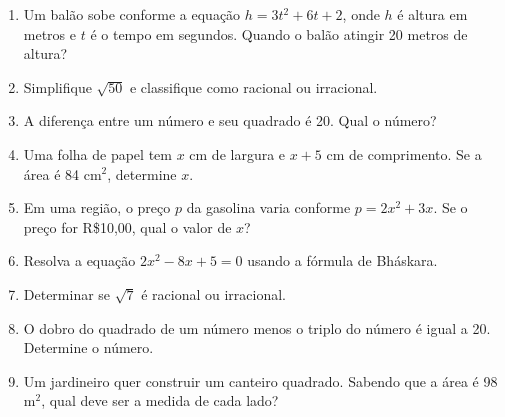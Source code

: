 \documentclass[12pt,a4paper]{article}
\begin{document}
\begin{enumerate}
\item Um bal\~ao sobe conforme a equa\c{c}\~ao \(h = 3t^2 + 6t + 2\), onde \(h\) \'e altura em metros e \(t\) \'e o tempo em segundos. Quando o bal\~ao atingir 20 metros de altura?

\item Simplifique \(\sqrt{50}\) e classifique como racional ou irracional.

\item A diferen\c{c}a entre um n\'umero e seu quadrado \'e 20. Qual o n\'umero?

\item Uma folha de papel tem \(x\) cm de largura e \(x+5\) cm de comprimento. Se a \'{a}rea \'e 84 cm$^2$, determine \(x\).

\item Em uma regi\~ao, o pre\c{c}o \(p\) da gasolina varia conforme \(p = 2x^2 + 3x\). Se o pre\c{c}o for R\$10,00, qual o valor de \(x\)?

\item Resolva a equa\c{c}\~ao \(2x^2 - 8x + 5 = 0\) usando a f\'ormula de Bh\'askara.

\item Determinar se \(\sqrt{7}\) \'e racional ou irracional.

\item O dobro do quadrado de um n\'umero menos o triplo do n\'umero \'e igual a 20. Determine o n\'umero.

\item Um jardineiro quer construir um canteiro quadrado. Sabendo que a \'{a}rea \'e 98 m$^2$, qual deve ser a medida de cada lado?


\end{enumerate}
\end{document}

